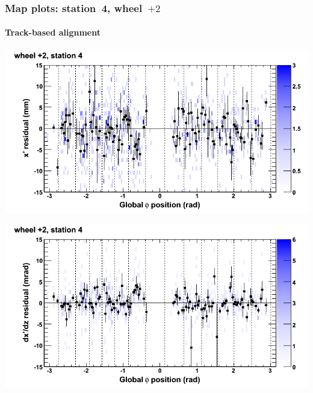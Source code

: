 \documentclass[compress]{beamer}
\begin{document}
\begin{frame}
\frametitle{Map plots: station~4, wheel~$+2$}
\framesubtitle{Track-based alignment}
\includegraphics[width=0.5\linewidth]{mapplots_re05/DTvsphi_st4whE_x.png}

\includegraphics[width=0.5\linewidth]{mapplots_re05/DTvsphi_st4whE_dxdz.png}
\end{frame}
\end{document}
